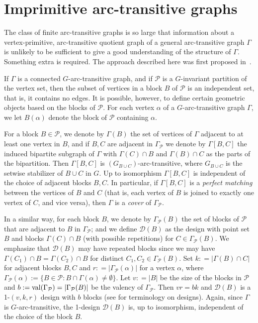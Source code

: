\documentclass[12pt, a4paper]{article}
\def\G{\Gamma}
\begin{document}
\section{Imprimitive arc-transitive graphs}

The class of finite arc-transitive graphs is so large that information about
a vertex-primitive, arc-transitive quotient graph of a general arc-transitive
graph $\G$ is unlikely to be sufficient to give a good understanding of 
the structure of $\G$. Something extra is required. The approach described here was first
proposed in~\cite{Gardiner-Praeger95}.

If $\G$ is a connected $G$-arc-transitive graph, and if $\mathcal{P}$ is 
a $G$-invariant partition of the vertex set, then the  subset of vertices in
a block $B$ of $\mathcal{P}$ is an independent set, that is, it contains 
no edges. It is possible, however, to define certain geometric objects
based on the blocks of $\mathcal{P}$.
For each vertex $\alpha$ of a $G$-arc-transitive graph $\Gamma$, we let
$B(\alpha)$ denote the block of $\mathcal{P}$ containing $\alpha$. 

For a block $B \in \mathcal{P}$, we denote by $\Gamma(B)$ the set of vertices of
$\Gamma$ adjacent to at least one vertex in $B$, and if $B, C$ are adjacent in
$\G_\mathcal{P}$ we denote by $\Gamma[B, C]$ the induced bipartite subgraph of
$\Gamma$ with $\Gamma (C) \cap B$ and $\Gamma (B) \cap C$ as the parts of the
bipartition.  Then $\Gamma[B, C]$ is $(G_{B \cup C})$-arc-transitive, where
$G_{B \cup C}$ is the setwise stabilizer of $B \cup C$ in $G$.  Up to
isomorphism $\Gamma[B, C]$ is independent of the choice of adjacent blocks $B,
C$.  In particular, if $\Gamma[B, C]$ is a \emph{perfect matching} between the
vertices of $B$ and $C$ (that is, each vertex of $B$ is joined to exactly one
vertex of $C$, and vice versa), then $\Gamma$ is a {\em cover} of
$\Gamma_{\mathcal{P}}$.

In a similar way, for each block $B$, we denote by $\Gamma_{\mathcal{P}}(B)$ 
the set of blocks of $\mathcal{P}$ that are adjacent to $B$ in 
$\Gamma_{\mathcal{P}}$; and we define $\mathcal{D}(B)$
as the design with point set $B$ and blocks $\Gamma (C) \cap B$  
(with possible repetitions) for $C \in \Gamma_{\mathcal{P}}(B)$.
We emphasize that $\mathcal{D}(B)$ may have repeated blocks
since we may have 
$\Gamma (C_1) \cap B = \Gamma (C_2) \cap B$
for distinct $C_1,C_2 \in \Gamma_{\mathcal{P}}(B)$. 
Set $k : = |\Gamma (B) \cap C|$ for adjacent blocks
$B, C$ and $r : = |\Gamma_{\mathcal{P}}(\alpha)|$ for a vertex $\alpha$, 
where $\Gamma_{\mathcal{P}}(\alpha) 
:= \{B \in {\mathcal{P}}: B \cap \Gamma(\alpha) \neq \emptyset\}$. 
Let $v : = |B|$ be the size of the blocks in $\mathcal{P}$ and
$b : = {\rm val}(\Gamma_{\mathcal{P}}) = |\Gamma_{\mathcal{P}}(B)|$ be 
the valency of $\Gamma_{\mathcal{P}}$.
Then $vr = bk$ and $\mathcal{D}(B)$ is a 1-$(v, k, r)$ design with $b$ 
blocks (see \cite{Biggs-White} for terminology on designs).
Again, since $\Gamma$ is $G$-arc-transitive,  
the 1-design $\mathcal{D}(B)$ is, up to isomorphism, independent of the 
choice of the block $B$.
\end{document}
